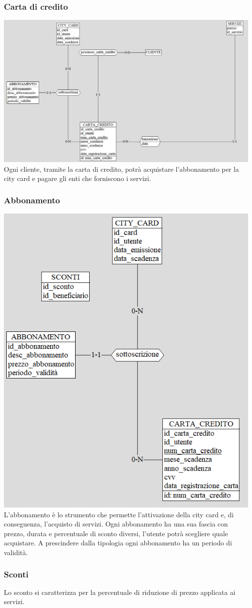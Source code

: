 \subsubsection{Carta di credito}
\includegraphics[width=0.95\columnwidth]{images/CartaDiCredito.png}\\
Ogni cliente, tramite la carta di credito, potrà acquistare l'abbonamento per la city card e pagare gli enti che forniscono i servizi.


\subsubsection{Abbonamento}
\includegraphics[width=0.95\columnwidth]{images/Abbonamento.png}\\
L'abbonamento è lo strumento che permette l'attivazione della city card e, di conseguenza, l'acquisto di servizi. Ogni abbonamento ha una sua fascia con prezzo, durata e percentuale di sconto diversi, l'utente potrà scegliere quale acquistare. A prescindere dalla tipologia ogni abbonamento ha un periodo di validità.

\subsubsection{Sconti}
Lo sconto si caratterizza per la percentuale di riduzione di prezzo applicata ai servizi.